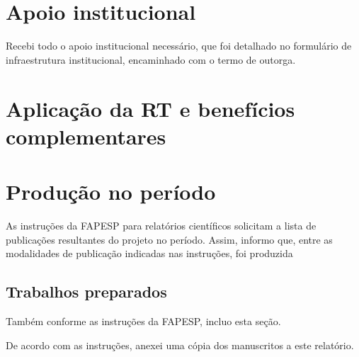 \documentclass[12pt, A4]{article}
\begin{document}
\section{Apoio institucional} %
Recebi todo o apoio institucional necessário, que foi detalhado no formulário de infraestrutura institucional, 
encaminhado com o termo de outorga. 

\section{Aplicação da RT e benefícios complementares} %


\section{Produção no período} %
As instruções da FAPESP para relatórios científicos solicitam a lista de publicações resultantes do projeto no período.
Assim, informo que, entre as modalidades de publicação indicadas nas instruções, foi produzida 


\subsection{Trabalhos preparados} %
Também conforme as instruções da FAPESP, incluo esta seção. 

De acordo com as instruções, anexei uma cópia dos manuscritos a este relatório.


\end{document}
